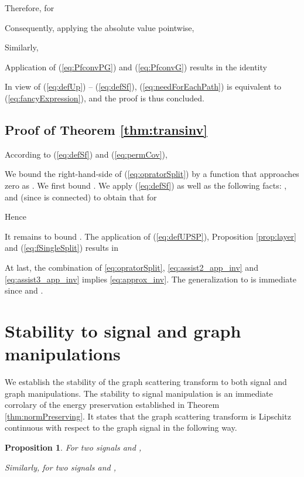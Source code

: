 \documentclass{article}
\newtheorem{proposition}[theorem]{Proposition}
\begin{document}
Therefore, for 

Consequently, applying the absolute value pointwise,


Similarly,


Application of (\ref{eq:PfconvPG}) and (\ref{eq:PfconvG}) results in the identity

In view of (\ref{eq:defUp}) -- (\ref{eq:defSf}),  (\ref{eq:needForEachPath}) is equivalent to (\ref{eq:fancyExpression}), and the proof is thus concluded.

\subsection{Proof of Theorem \ref{thm:transinv}}\label{subsec:prooftransinv}
According to (\ref{eq:defSf}) and (\ref{eq:permCov}),


We bound the right-hand-side of (\ref{eq:opratorSplit}) by a function that approaches zero as . We first bound . 
We apply (\ref{eq:defSf}) as well as the following facts: ,  and  (since  is connected) to obtain that for 

Hence

It remains to bound . 
The application of (\ref{eq:defUPSP}), Proposition \ref{prop:layer} and (\ref{eq:fSingleSplit}) results in 

At last, the combination of \eqref{eq:opratorSplit}, \eqref{eq:assist2_app_inv} and \eqref{eq:assist3_app_inv} implies \eqref{eq:approx_inv}. The generalization to  is immediate since  and .



\section{Stability to {signal and} graph manipulations}\label{sec:stability}
{We establish the stability of the graph scattering transform to both signal and graph manipulations. The stability to signal manipulation is an immediate corrolary of the energy preservation established in Theorem \ref{thm:normPreserving}. It states that the graph scattering transform is Lipschitz continuous with respect to the graph signal in the following way.}
{
\begin{proposition}
\label{cor:stabilitysignal}
For two signals  and ,

Similarly, for two signals  and ,

\end{proposition}
}
\end{document}
